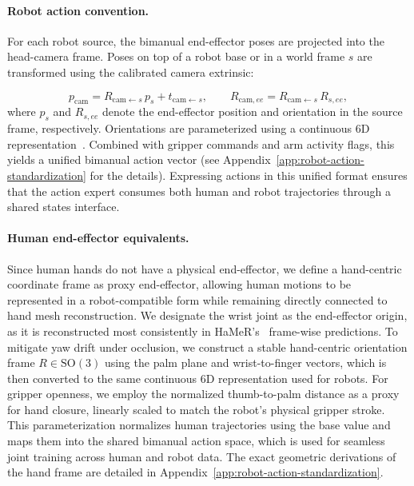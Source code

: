 \documentclass{llmxive}
\begin{document}
\paragraph{Robot action convention.}
For each robot source, the bimanual end-effector poses are projected into the head-camera frame. Poses on top of a robot base or in a world frame $s$ are transformed using the calibrated camera extrinsic:

\begin{equation}
  p_{\mathrm{cam}} = R_{\mathrm{cam}\leftarrow s}\, p_s + t_{\mathrm{cam}\leftarrow s},
  \qquad
  R_{\mathrm{cam},ee} = R_{\mathrm{cam}\leftarrow s}\, R_{s,ee},
  \label{eq:cam-transform}
\end{equation}
where $p_s$ and $R_{s,ee}$ denote the end-effector position and orientation in the source frame, respectively. Orientations are parameterized using a continuous 6D representation~\cite{zhou2019continuity}. Combined with gripper commands and arm activity flags, this yields a unified bimanual action vector (see Appendix~\ref{app:robot-action-standardization} for the details). Expressing actions in this unified format ensures that the action expert consumes both human and robot trajectories through a shared states interface.

\paragraph{Human end-effector equivalents.}
Since human hands do not have a physical end-effector, we define a hand-centric coordinate frame as proxy end-effector, allowing human motions to be represented in a robot-compatible form while remaining directly connected to hand mesh reconstruction.
We designate the wrist joint as the end-effector origin, as it is reconstructed most consistently in HaMeR's~\cite{pavlakos2024reconstructing} frame-wise predictions. To mitigate yaw drift under occlusion, we construct a stable hand-centric orientation frame $R \in \mathrm{SO}(3)$ using the palm plane and wrist-to-finger vectors, which is then converted to the same continuous 6D representation used for robots. For gripper openness, we employ the normalized thumb-to-palm distance as a proxy for hand closure, linearly scaled to match the robot's physical gripper stroke. This parameterization normalizes human trajectories using the base value and maps them into the shared bimanual action space, which is used for seamless joint training across human and robot data. The exact geometric derivations of the hand frame are detailed in Appendix~\ref{app:robot-action-standardization}.
\end{document}
